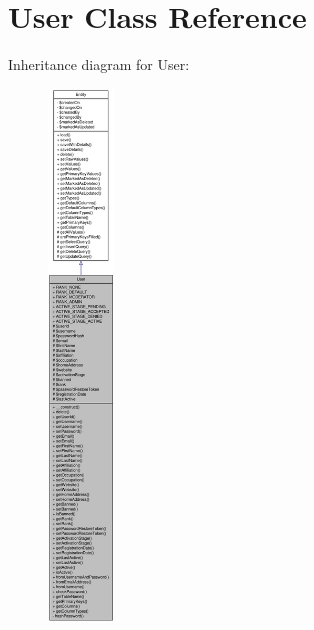 \hypertarget{classUser}{
\section{User Class Reference}
\label{classUser}
}


Inheritance diagram for User:\nopagebreak
\begin{figure}[H]
\begin{center}
\leavevmode
\includegraphics[height=400pt]{classUser__inherit__graph}
\end{center}
\end{figure}



